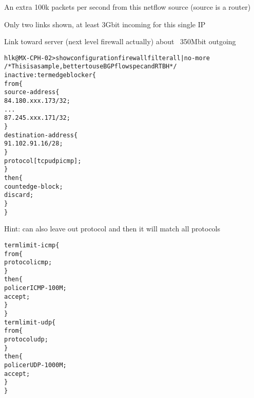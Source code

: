 \documentclass[20pt,landscape,a4paper,footrule]{foils}
\begin{document}








\centerline{An extra 100k packets per second from this netflow source (source is a router)}




\centerline{Only two links shown, at least 3Gbit incoming for this single IP}

\centerline{Link toward server (next level firewall actually) about ~350Mbit outgoing}



\begin{alltt}\footnotesize
hlk@MX-CPH-02> show configuration firewall filter all | no-more
/* This is a sample, better to use BGP flowspec and RTBH */
inactive: term edgeblocker \{
    from \{
        source-address \{
            84.180.xxx.173/32;
...
            87.245.xxx.171/32;
        \}
        destination-address \{
            91.102.91.16/28;
        \}
        protocol [ tcp udp icmp ];
    \}
    then \{
        count edge-block;
        discard;
    \}
\}
\end{alltt}
Hint: can also leave out protocol and then it will match all protocols


\begin{alltt}\footnotesize
term limit-icmp \{
    from \{
        protocol icmp;
    \}
    then \{
        policer ICMP-100M;
        accept;
    \}
\}
term limit-udp \{
    from \{
        protocol udp;
    \}
    then \{
        policer UDP-1000M;
        accept;
    \}
\}
\end{alltt}
\end{document}
